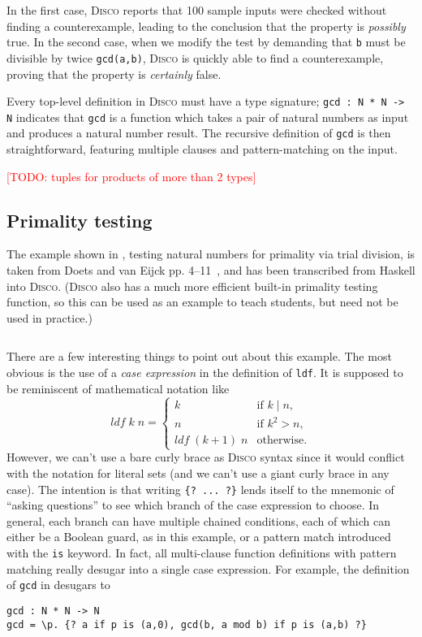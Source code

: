 \documentclass[submission,copyright,creativecommons]{eptcs}
\newcommand{\disco}{\textsc{Disco}\xspace}
\newcommand{\pref}[1]{\prettyref{#1}}
\newcommand{\todo}[1]{\textcolor{red}{[TODO: #1]}}
\newcommand{\todo}[1]{}
\begin{document}
In the first case, \disco reports that 100 sample inputs were checked
without finding a counterexample, leading to the conclusion that the
property is \emph{possibly} true.  In the second case, when we modify
the test by demanding that \verb|b| must be divisible by twice
\verb|gcd(a,b)|, \disco is quickly able to find a counterexample,
proving that the property is \emph{certainly} false.

Every top-level definition in \disco must have a type signature;
\verb|gcd : N * N -> N| indicates that \verb|gcd| is a function which
takes a pair of natural numbers as input and produces a natural number
result.  The recursive definition of \verb|gcd| is then
straightforward, featuring multiple clauses and pattern-matching on
the input.

\todo{tuples for products of more than 2 types}

\subsection{Primality testing}
\label{sec:primetest}

The example shown in \pref{lst:prime}, testing natural numbers for
primality via trial division, is taken from Doets and van Eijck
pp. 4--11~\cite{Doets:2004}, and has been transcribed from Haskell
into \disco. (\disco also has a much more efficient built-in primality
testing function, so this can be used as an example to teach students,
but need not be used in practice.)

\begin{listing}[!htp]
\inputminted{text}{examples/prime.disco}
\caption{Primality testing in \disco}
\label{lst:prime}
\end{listing}

There are a few interesting things to point out about this example.
The most obvious is the use of a \emph{case expression} in the
definition of \verb|ldf|.  It is supposed to be reminiscent of
mathematical notation like
\[ \mathit{ldf}\;k\;n = \begin{cases} k & \text{if } k \mid n, \\ n &
    \text{if } k^2 > n, \\ \mathit{ldf}\;(k+1)\;n &
    \text{otherwise.} \end{cases} \] However, we can't use a bare
curly brace as \disco syntax since it would conflict with the notation
for literal sets (and we can't use a giant curly brace in any case).
The intention is that writing %
\verb|{? ... ?}| lends itself to the mnemonic of ``asking questions''
to see which branch of the case expression to choose.  In general,
each branch can have multiple chained conditions, each of which can
either be a Boolean guard, as in this example, or a pattern match
introduced with the \verb|is| keyword.  In fact, all multi-clause
function definitions with pattern matching really desugar into a
single case expression. For example, the definition of \verb|gcd| in
\pref{lst:gcd} desugars to
\begin{verbatim}
gcd : N * N -> N
gcd = \p. {? a if p is (a,0), gcd(b, a mod b) if p is (a,b) ?}
\end{verbatim}
\end{document}
